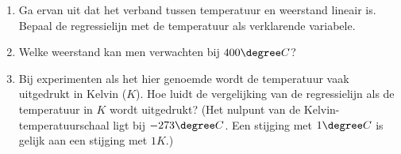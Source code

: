 
\begin{enumerate}[label=(\alph*)]
    \item Ga ervan uit dat het verband tussen temperatuur en weerstand lineair is.
    Bepaal de regressielijn met de temperatuur als verklarende variabele.
    \answer{

    }

    \item Welke weerstand kan men verwachten bij $400\degree C$?
    \answer{

    }

    \item Bij experimenten als het hier genoemde wordt de temperatuur vaak uitgedrukt in Kelvin ($K$).
    Hoe luidt de vergelijking van de regressielijn als de temperatuur in $K$ wordt uitgedrukt?
    (Het nulpunt van de Kelvin-temperatuurschaal ligt bij $-273\degree C$.
    Een stijging met $1\degree C$ is gelijk aan een stijging met $1 K$.)
    \answer{
    
    }
\end{enumerate}